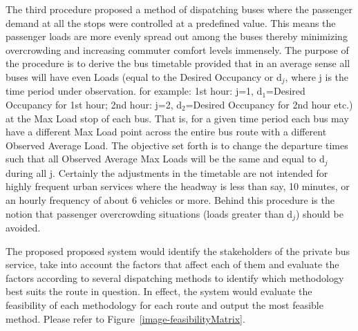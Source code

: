 \documentclass[12pt, oneside]{report}
\begin{document}
The third procedure proposed a method of dispatching buses where the passenger demand at all the stops were controlled at a predefined value. This means the passenger loads are more evenly spread out among the buses thereby minimizing overcrowding and increasing commuter comfort levels immensely. The purpose of the procedure is to derive the bus timetable provided that in an average sense all buses will have even Loads (equal to the Desired Occupancy or d$_j$, where j is the time period under observation. for example: 1st hour: j=1, d$_1$=Desired Occupancy for 1st hour; 2nd hour: j=2, d$_2$=Desired Occupancy for 2nd hour etc.) at the Max Load stop of each bus. That is, for a given time period each bus may have a different Max Load point across the entire bus route with a different Observed Average Load. The objective set forth is to change the departure times such that all Observed Average Max Loads will be the same and equal to d$_j$ during all j. Certainly the adjustments in the timetable are not intended for highly frequent urban services where the headway is less than say, 10 minutes, or an hourly frequency of about 6 vehicles or more. Behind this procedure is the notion that passenger overcrowding situations (loads greater than d$_j$) should be avoided.

The proposed proposed system would identify the stakeholders of the private bus service, take into account the factors that affect each of them and evaluate the factors according to several dispatching methods to identify which methodology best suits the route in question. In effect, the system would evaluate the feasibility of each methodology for each route and output the most feasible method. Please refer to Figure~\ref{image-feasibilityMatrix}.
\end{document}
